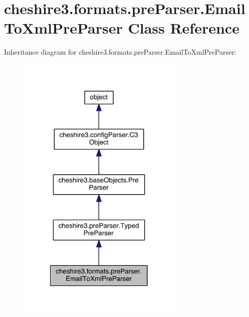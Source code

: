 \hypertarget{classcheshire3_1_1formats_1_1pre_parser_1_1_email_to_xml_pre_parser}{\section{cheshire3.\-formats.\-pre\-Parser.\-Email\-To\-Xml\-Pre\-Parser Class Reference}
\label{classcheshire3_1_1formats_1_1pre_parser_1_1_email_to_xml_pre_parser}
}


Inheritance diagram for cheshire3.\-formats.\-pre\-Parser.\-Email\-To\-Xml\-Pre\-Parser\-:
\nopagebreak
\begin{figure}[H]
\begin{center}
\leavevmode
\includegraphics[width=224pt]{classcheshire3_1_1formats_1_1pre_parser_1_1_email_to_xml_pre_parser__inherit__graph}
\end{center}
\end{figure}


